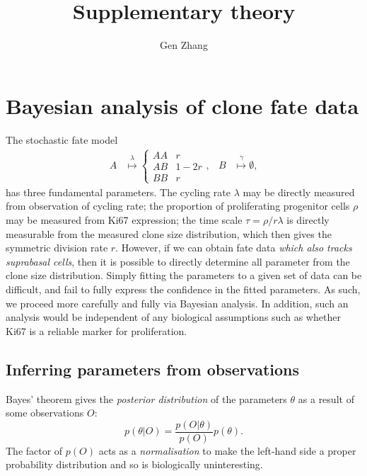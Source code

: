 \documentclass[10pt,UKenglish]{article}
\begin{document}
\title{Supplementary theory}
\author{Gen Zhang}
 
\maketitle

\renewcommand{\thesection}{S-\Roman{section}}

\section{Bayesian analysis of clone fate data}

The stochastic fate model 
\begin{align}
A &\overset{\lambda}{\longmapsto} \begin{cases}
AA & r \\
AB & 1-2r \\
BB & r\end{cases}, & B &\overset{\gamma}{\longmapsto} \emptyset,
\label{eq:basal-model}
\end{align}
has three fundamental parameters. The cycling rate $\lambda$ may be directly measured from observation of cycling rate; the proportion of proliferating progenitor cells $\rho$ may be measured from Ki67 expression; the time scale $\tau = \rho/r\lambda$ is directly measurable from the measured clone size distribution, which then gives the symmetric division rate $r$. However, if we can obtain fate data \emph{which also tracks suprabasal cells}, then it is possible to directly determine all parameter from the clone size distribution. Simply fitting the parameters to a given set of data can be difficult, and fail to fully express the confidence in the fitted parameters. As such, we proceed more carefully and fully via Bayesian analysis. In addition, such an analysis would be independent of any biological assumptions such as whether Ki67 is a reliable marker for proliferation.

\subsection{Inferring parameters from observations}

Bayes' theorem gives the \emph{posterior distribution} of the parameters $\theta$ as a result of some observations $O$: $$p(\theta|O) = \frac{p(O|\theta)}{p(O)} p(\theta).$$ The factor of $p(O)$ acts as a \emph{normalisation} to make the left-hand side a proper probability distribution and so is biologically uninteresting. 
\end{document}
